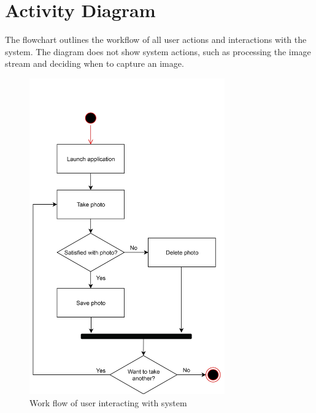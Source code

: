 \chapter{Activity Diagram}

The flowchart outlines the workflow of all user actions and interactions with the system. The diagram does not show system actions, such as processing the image stream and deciding when to capture an image.

\begin{figure}[!h]
    \centering
    \includegraphics[width=0.75\textwidth]{activitydiagram}
    \caption{Work flow of user interacting with system}
    \label{fig:activitydiagram}
\end{figure}


